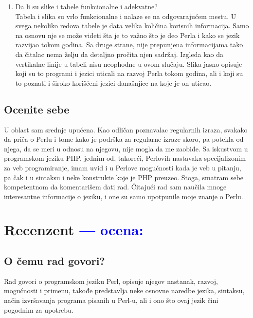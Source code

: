 \documentclass[a4paper]{report}
\newcommand{\odgovor}[1]{\textcolor{blue}{#1}}
\begin{document}
\begin{enumerate}
\item Da li su slike i tabele funkcionalne i adekvatne?\\
Tabela i slika su vrlo funkcionalne i nalaze se na odgovarajućem mestu. U svega nekoliko redova tabele je data velika količina korisnih informacija. Samo na osnovu nje se može videti šta je to važno što je deo Perla i kako se jezik razvijao tokom godina. Sa druge strane, nije prepunjena informacijama tako da čitalac nema želju da detaljno pročita njen sadržaj. Izgleda kao da vertikalne linije u tabeli nisu neophodne u ovom slučaju. Slika jasno opisuje koji su to programi i jezici uticali na razvoj Perla tokom godina, ali i koji su to poznati i široko korišćeni jezici današnjice na koje je on uticao.  
\end{enumerate}

\section{Ocenite sebe}
U oblast sam srednje upućena. Kao odličan poznavalac regularnih izraza, svakako da priča o Perlu i tome kako je podrška za regularne izraze skoro, pa potekla od njega, da se meri u odnosu na njegovu, nije mogla da me zaobiđe. Sa iskustvom u programskom jeziku PHP, jednim od, takoreći, Perlovih nastavaka specijalizonim za veb programiranje, imam uvid i u Perlove mogućnosti kada je veb u pitanju, pa čak i u sintaksu i neke konstrukte koje je PHP preuzeo. Stoga, smatram sebe kompetentnom da komentarišem dati rad. Čitajući rad sam naučila mnoge interesantne informacije o jeziku, i one su samo upotpunile moje znanje o Perlu.

\chapter{Recenzent \odgovor{--- ocena:} }


\section{O čemu rad govori?}
Rad govori o programskom jeziku Perl, opisuje njegov nastanak, razvoj, mogućnosti i primenu, takođe predstavlja neke osnovne naredbe jezika, sintaksu, način izvršavanja programa pisanih u Perl-u, ali i ono što ovaj jezik čini pogodnim za upotrebu.
\end{document}
